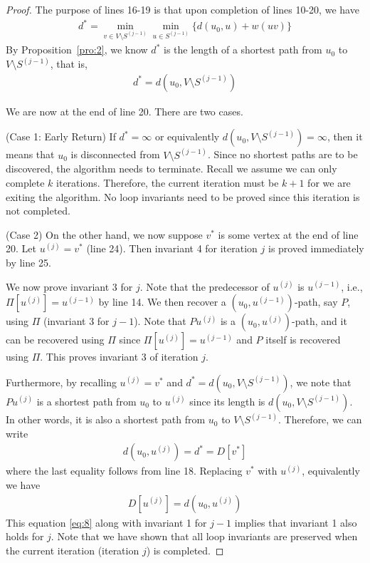 \documentclass[thmcnt=section, 12pt, color=cyan]{my-elegantbook}
\begin{document}
\begin{proof}
    The purpose of lines 16-19 is that upon completion of lines 10-20, we have 
    \begin{align*}
        d^\ast = \min_{v \in V \setminus S^{(j-1)}}
            \min_{u \in S^{(j-1)}} \{ d(u_0, u) + w(u v) \}
    \end{align*}
    By Proposition~\ref{pro:2}, we know $d^\ast$ is the length of a shortest path from $u_0$ to $V \setminus S^{(j-1)}$, that is, 
    \begin{align*}
        d^\ast = d(u_0, V \setminus S^{(j-1)})
    \end{align*}

    We are now at the end of line 20. There are two cases. 
    
    (Case 1: Early Return) If $d^\ast = \infty$ or equivalently $d(u_0, V \setminus S^{(j-1)}) = \infty$, then it means that $u_0$ is disconnected from $V \setminus S^{(j-1)}$. Since no shortest paths are to be discovered, the algorithm needs to terminate. Recall we assume we can only complete $k$ iterations. Therefore, the current iteration must be $k+1$ for we are exiting the algorithm. No loop invariants need to be proved since this iteration is not completed.

    (Case 2) On the other hand, we now suppose $v^\ast$ is some vertex at the end of line 20. Let $u^{(j)} = v^\ast$ (line 24). Then invariant 4 for iteration $j$ is proved immediately by line 25.
    
    We now prove invariant 3 for $j$. Note that the predecessor of $u^{(j)}$ is $u^{(j-1)}$, i.e., $\Pi[u^{(j)}] = u^{(j-1)}$ by line 14. We then recover a $(u_0, u^{(j-1)})$-path, say $P$, using $\Pi$ (invariant 3 for $j-1$). Note that $P u^{(j)}$ is a $(u_0, u^{(j)})$-path, and it can be recovered using $\Pi$ since $\Pi[u^{(j)}] = u^{(j-1)}$ and $P$ itself is recovered using $\Pi$. This proves invariant 3 of iteration $j$.

    Furthermore, by recalling $u^{(j)} = v^\ast$ and $d^\ast = d(u_0, V \setminus S^{(j-1)})$, we note that $P u^{(j)}$ is a shortest path from $u_0$ to $u^{(j)}$ since its length is $d(u_0, V \setminus S^{(j-1)})$. In other words, it is also a shortest path from $u_0$ to $V \setminus S^{(j-1)}$. Therefore, we can write 
    \begin{align*}
        d(u_0, u^{(j)}) = d^\ast = D[v^\ast]
    \end{align*}
    where the last equality follows from line 18. Replacing $v^\ast$ with $u^{(j)}$, equivalently we have 
    \begin{align}
        D[u^{(j)}] = d(u_0, u^{(j)})
        \label{eq:8}
    \end{align}
    This equation \eqref{eq:8} along with invariant 1 for $j-1$ implies that invariant 1 also holds for $j$. Note that we have shown that all loop invariants are preserved when the current iteration (iteration $j$) is completed.


\end{proof}
\end{document}

